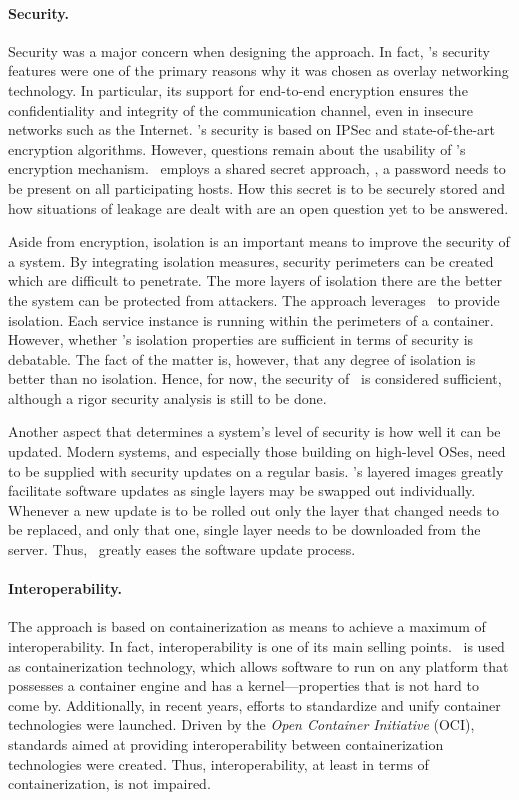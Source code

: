 \paragraph{Security.}
Security was a major concern when designing the approach. In fact, \weave 's security features were one of the primary reasons why it was chosen as overlay networking technology. In particular, its support for end-to-end encryption ensures the confidentiality and integrity of the communication channel, even in insecure networks such as the Internet. \wnet 's security is based on IPSec and state-of-the-art encryption algorithms. However, questions remain about the usability of \weave 's encryption mechanism. \weave\ employs a shared secret approach, \ie , a password needs to be present on all participating hosts. How this secret is to be securely stored and how situations of leakage are dealt with are an open question yet to be answered.

Aside from encryption, isolation is an important means to improve the security of a system. By integrating isolation measures, security perimeters can be created which are difficult to penetrate. The more layers of isolation there are the better the system can be protected from attackers. The approach leverages \docker\ to provide isolation. Each service instance is running within the perimeters of a container. However, whether \docker 's isolation properties are sufficient in terms of security is debatable. The fact of the matter is, however, that any degree of isolation is better than no isolation. Hence, for now, the security of \docker\ is considered sufficient, although a rigor security analysis is still to be done.

Another aspect that determines a system's level of security is how well it can be updated. Modern systems, and especially those building on high-level OSes, need to be supplied with security updates on a regular basis. \docker 's layered images greatly facilitate software updates as single layers may be swapped out individually. Whenever a new update is to be rolled out only the layer that changed needs to be replaced, and only that one, single layer needs to be downloaded from the server. Thus, \docker\ greatly eases the software update process.


\paragraph{Interoperability.}
The approach is based on containerization as means to achieve a maximum of interoperability. In fact, interoperability is one of its main selling points. \docker\ is used as containerization technology, which allows software to run on any platform that possesses a container engine and has a kernel---properties that is not hard to come by. Additionally, in recent years, efforts to standardize and unify container technologies were launched. Driven by the \emph{Open Container Initiative} (OCI), standards aimed at providing interoperability between containerization technologies were created. Thus, interoperability, at least in terms of containerization, is not impaired.

